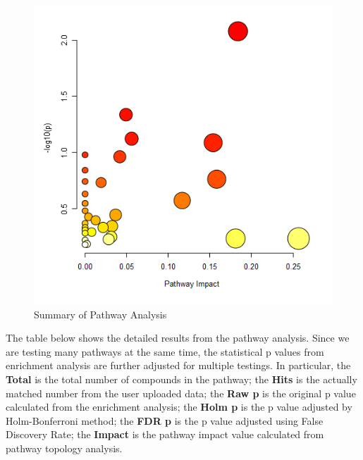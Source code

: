 \documentclass[a4paper]{article}
\begin{document}
\begin{figure}[htp]
\begin{center}
\includegraphics[width=1.0\textwidth]{path_view_0_dpi72.png}
\caption{Summary of Pathway Analysis}
\end{center}
\label{path_view_0_dpi72.png}
\end{figure}
\clearpage


The table below shows the detailed results from the pathway analysis. Since
we are testing many pathways at the same time, the statistical p values from
enrichment analysis are further adjusted for multiple testings. In particular, 
the \textbf{Total} is the total number of compounds in the pathway;
the \textbf{Hits} is the actually matched number from the user uploaded data;
the \textbf{Raw p} is the original p value calculated from the enrichment analysis;
the \textbf{Holm p} is the p value adjusted by Holm-Bonferroni method;
the \textbf{FDR p} is the p value adjusted using False Discovery Rate;
the \textbf{Impact} is the pathway impact value calculated from pathway topology analysis.
\end{document}

